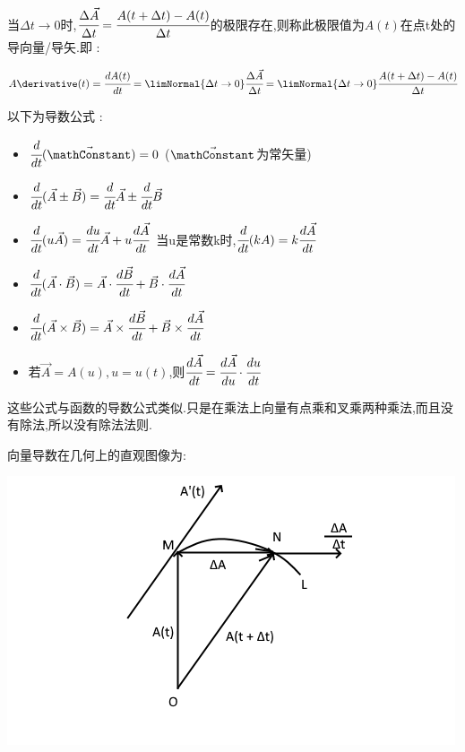 {{{{      当$\Delta t \to 0$时,$\cfrac{\Delta \vec{A}}{\Delta t} = \cfrac{A(t + \Delta t) - A(t)}{\Delta t}$的极限存在,则称此极限值为$A(t)$在点t处的导向量/导矢.即 :

      $$
        A\derivative(t) = \cfrac{dA(t)}{dt} = \limNormal{\Delta t \to 0}\cfrac{\Delta \vec{A}}{\Delta t} = \limNormal{\Delta t \to 0}\cfrac{A(t + \Delta t) - A(t)}{\Delta t}
      $$

      以下为导数公式 :

      \begin{itemize}
        \item $\cfrac{d}{dt}(\vec{\mathConstant}) = 0$ ($\vec{\mathConstant}$为常矢量)
        \item $\cfrac{d}{dt}(\vec{A} \pm \vec{B}) = \cfrac{d}{dt}\vec{A} \pm \cfrac{d}{dt}\vec{B}$
        \item $\cfrac{d}{dt}(u\vec{A}) = \cfrac{du}{dt}\vec{A} + u\cfrac{d\vec{A}}{dt}$\ 当u是常数k时,$\cfrac{d}{dt}(kA) = k\cfrac{d\vec{A}}{dt}$
        \item $\cfrac{d}{dt}(\vec{A}\cdot\vec{B}) = \vec{A}\cdot\cfrac{d\vec{B}}{dt} + \vec{B}\cdot\cfrac{d\vec{A}}{dt}$
        \item $\cfrac{d}{dt}(\vec{A}\times\vec{B}) = \vec{A}\times\cfrac{d\vec{B}}{dt} + \vec{B}\times\cfrac{d\vec{A}}{dt}$
        \item 若$\vec{A} = A(u),u = u(t)$,则$\cfrac{d\vec{A}}{dt} = \cfrac{d\vec{A}}{du}\cdot\cfrac{du}{dt}$
      \end{itemize}

      这些公式与函数的导数公式类似.只是在乘法上向量有点乘和叉乘两种乘法,而且没有除法,所以没有除法法则.

      向量导数在几何上的直观图像为:

      \includegraphics{resources/derivativeOfVectorFunction.png}

}}}}
